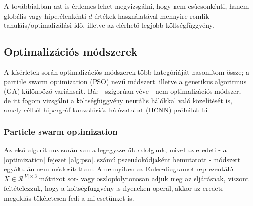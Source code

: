 A továbbiakban azt is érdemes lehet megvizsgálni, hogy nem csúcsonkénti, hanem globális vagy hiperélenkénti $d$ értékek használatával mennyire romlik tanuláis/optimalizálási idő, illetve az elérhető legjobb költségfüggvény.



\subsection{Optimalizációs módszerek} \label{optimizationMethods}

A kísérletek során optimalizációs módszerek több kategóriáját hasonlítom össze; a particle swarm optimization (PSO) nevű módszert, illetve a genetikus algoritmus (GA) különböző variánsait. Bár - szigorúan véve - nem optimalizációs módszer, de itt fogom vizsgálni a költségfüggvény neurális hálókkal való közelítését is, amely célból hipergráf konvolúciós hálózatokat (HCNN) próbálok ki.

\subsubsection{Particle swarm optimization}
Az első algoritmus során van a legegyszerűbb dolgunk, mivel az eredeti - a \ref{optimization} fejezet \ref{alg:pso}. számú pszeudokódjaként bemutatott - módszert egyáltalán nem módosítottam. Amennyiben az Euler-diagramot reprezentáló $X \in \mathcal{R}^{|V| \times 3}$ mátrixot sor- vagy oszlopfolytonosan adjuk meg az eljárásnak, viszont feltételezzük, hogy a költségfüggvény is ilyeneken operál, akkor az eredeti megoldás tökéletesen fedi a mi esetünket is.

